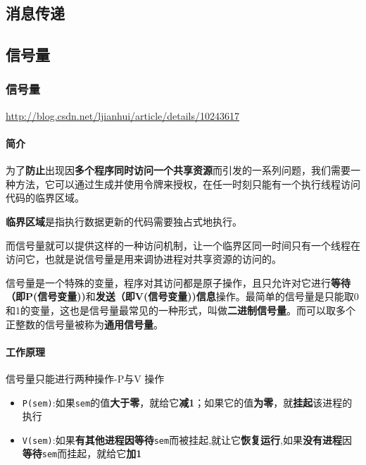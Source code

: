 \documentclass[UTF8,a4paper,8pt]{ctexbook}
\begin{document}
		\subsection{消息传递}
		
		\subsection{信号量}
			\subsubsection{信号量}
				\url{http://blog.csdn.net/ljianhui/article/details/10243617}
				\paragraph{简介}
					为了\textbf{防止}出现因\textbf{多个程序同时访问一个共享资源}而引发的一系列问题，我们需要一种方法，它可以通过生成并使用令牌来授权，在任一时刻只能有一个执行线程访问代码的临界区域。
					
					\textbf{临界区域}是指执行数据更新的代码需要独占式地执行。
					
					而信号量就可以提供这样的一种访问机制，让一个临界区同一时间只有一个线程在访问它，也就是说信号量是用来调协进程对共享资源的访问的。
					
					信号量是一个特殊的变量，程序对其访问都是原子操作，且只允许对它进行\textbf{等待（即P(信号变量))}和\textbf{发送（即V(信号变量))信息}操作。最简单的信号量是只能取0和1的变量，这也是信号量最常见的一种形式，叫做\textbf{二进制信号量}。而可以取多个正整数的信号量被称为\textbf{通用信号量}。
					
				\paragraph{工作原理}
					信号量只能进行两种操作-P与V 操作
						\begin{itemize}
							\item \verb|P(sem)|:如果\verb|sem|的值\textbf{大于零}，就给它\textbf{减1}；如果它的值\textbf{为零}，就\textbf{挂起}该进程的执行
							\item \verb|V(sem)|:如果\textbf{有其他进程因等待}\verb|sem|而被挂起,就让它\textbf{恢复运行},如果\textbf{没有进程}因\textbf{等待}\verb|sem|而挂起，就给它\textbf{加1}
						\end{itemize}
				
\end{document}
